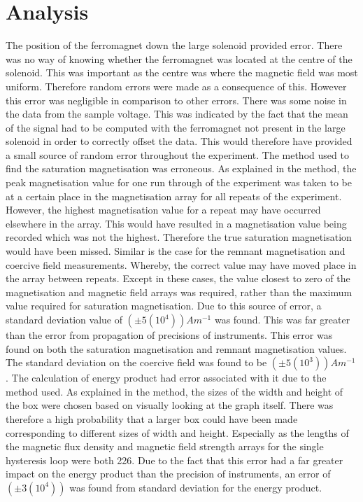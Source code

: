 \documentclass[a4paper]{article}\usepackage[english]{babel}
\begin{document}
\section{Analysis}
The position of the ferromagnet down the large solenoid provided error. There was no way of knowing whether the ferromagnet was located at the centre of the solenoid. This was important as the centre was where the magnetic field was most uniform. Therefore random errors were made as a consequence of this. However this error was negligible in comparison to other errors.
There was some noise in the data from the sample voltage. This was indicated by the fact that the mean of the signal had to be computed with the ferromagnet not present in the large solenoid in order to correctly offset the data. This would therefore have provided a small source of random error throughout the experiment. 
The method used to find the saturation magnetisation was erroneous. As explained in the method, the peak magnetisation value for one run through of the experiment was taken to be at a certain place in the magnetisation array for all repeats of the experiment. However, the highest magnetisation value for a repeat may have occurred elsewhere in the array. This would have resulted in a magnetisation value being recorded which was not the highest. Therefore the true saturation magnetisation would have been missed. Similar is the case for the remnant magnetisation and coercive field measurements. Whereby, the correct value may have moved place in the array between repeats. Except in these cases, the value closest to zero of the magnetisation and magnetic field arrays was required, rather than the maximum value required for saturation magnetisation. Due to this source of error, a standard deviation value of $(±5(10^4))Am^{-1}$ was found. This was far greater than the error from propagation of precisions of instruments. This error was found on both the saturation magnetisation and remnant magnetisation values. The standard deviation on the coercive field was found to be $(±5(10^3))Am^{-1}$. 
The calculation of energy product had error associated with it due to the method used. As explained in the method, the sizes of the width and height of the box were chosen based on visually looking at the graph itself. There was therefore a high probability that a larger box could have been made corresponding to different sizes of width and height. Especially as the lengths of the magnetic flux density and magnetic field strength arrays for the single hysteresis loop were both 226. Due to the fact that this error had a far greater impact on the energy product than the precision of instruments, an error of $(±3(10^4))$ was found from standard deviation for the energy product. 
\end{document}
